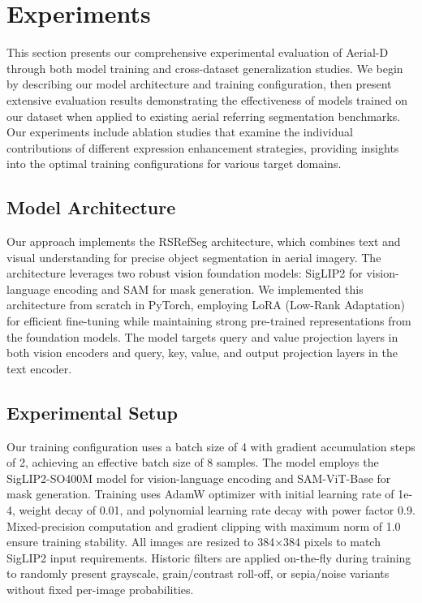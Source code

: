 
\section{Experiments}
\label{sec:experiments}

This section presents our comprehensive experimental evaluation of Aerial-D through both model training and cross-dataset generalization studies. We begin by describing our model architecture and training configuration, then present extensive evaluation results demonstrating the effectiveness of models trained on our dataset when applied to existing aerial referring segmentation benchmarks. Our experiments include ablation studies that examine the individual contributions of different expression enhancement strategies, providing insights into the optimal training configurations for various target domains.

\subsection{Model Architecture}
\label{subsec:model_architecture}

Our approach implements the RSRefSeg architecture\cite{chen2025rsrefseg}, which combines text and visual understanding for precise object segmentation in aerial imagery. The architecture leverages two robust vision foundation models: SigLIP2\cite{siglip2} for vision-language encoding and SAM\cite{sam} for mask generation. We implemented this architecture from scratch in PyTorch, employing LoRA (Low-Rank Adaptation)\cite{lora} for efficient fine-tuning while maintaining strong pre-trained representations from the foundation models. The model targets query and value projection layers in both vision encoders and query, key, value, and output projection layers in the text encoder.

\subsection{Experimental Setup}
\label{subsec:experimental_setup}

Our training configuration uses a batch size of 4 with gradient accumulation steps of 2, achieving an effective batch size of 8 samples. The model employs the SigLIP2-SO400M model for vision-language encoding and SAM-ViT-Base for mask generation. Training uses AdamW optimizer\cite{adamw} with initial learning rate of 1e-4, weight decay of 0.01, and polynomial learning rate decay with power factor 0.9. Mixed-precision computation and gradient clipping with maximum norm of 1.0 ensure training stability. All images are resized to 384×384 pixels to match SigLIP2 input requirements. Historic filters are applied on-the-fly during training to randomly present grayscale, grain/contrast roll-off, or sepia/noise variants without fixed per-image probabilities.

